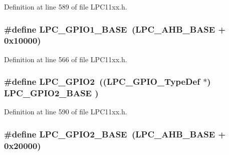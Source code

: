 Definition at line 589 of file L\+P\+C11xx.\+h.

\subsubsection[{\texorpdfstring{L\+P\+C\+\_\+\+G\+P\+I\+O1\+\_\+\+B\+A\+SE}{LPC_GPIO1_BASE}}]{\setlength{\rightskip}{0pt plus 5cm}\#define L\+P\+C\+\_\+\+G\+P\+I\+O1\+\_\+\+B\+A\+SE~({\bf L\+P\+C\+\_\+\+A\+H\+B\+\_\+\+B\+A\+SE}  + 0x10000)}\hypertarget{group___l_p_c11xx___definitions_ga9fb0536853721a3073bd69d94d0b7ec2}{}\label{group___l_p_c11xx___definitions_ga9fb0536853721a3073bd69d94d0b7ec2}


Definition at line 566 of file L\+P\+C11xx.\+h.

\subsubsection[{\texorpdfstring{L\+P\+C\+\_\+\+G\+P\+I\+O2}{LPC_GPIO2}}]{\setlength{\rightskip}{0pt plus 5cm}\#define L\+P\+C\+\_\+\+G\+P\+I\+O2~(({\bf L\+P\+C\+\_\+\+G\+P\+I\+O\+\_\+\+Type\+Def}   $\ast$) {\bf L\+P\+C\+\_\+\+G\+P\+I\+O2\+\_\+\+B\+A\+SE} )}\hypertarget{group___l_p_c11xx___definitions_ga27a09e8c08f9e209c6af70b0a3c56b39}{}\label{group___l_p_c11xx___definitions_ga27a09e8c08f9e209c6af70b0a3c56b39}


Definition at line 590 of file L\+P\+C11xx.\+h.

\subsubsection[{\texorpdfstring{L\+P\+C\+\_\+\+G\+P\+I\+O2\+\_\+\+B\+A\+SE}{LPC_GPIO2_BASE}}]{\setlength{\rightskip}{0pt plus 5cm}\#define L\+P\+C\+\_\+\+G\+P\+I\+O2\+\_\+\+B\+A\+SE~({\bf L\+P\+C\+\_\+\+A\+H\+B\+\_\+\+B\+A\+SE}  + 0x20000)}\hypertarget{group___l_p_c11xx___definitions_gae5524b2d728167194033ec7a1841a36b}{}\label{group___l_p_c11xx___definitions_gae5524b2d728167194033ec7a1841a36b}


